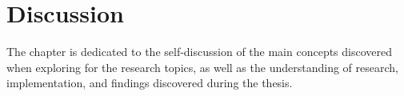 {\chapter{Discussion}}

The chapter is dedicated to the self-discussion of the main concepts discovered when exploring for the research topics, as well as the understanding of research, implementation, and findings discovered during the thesis.